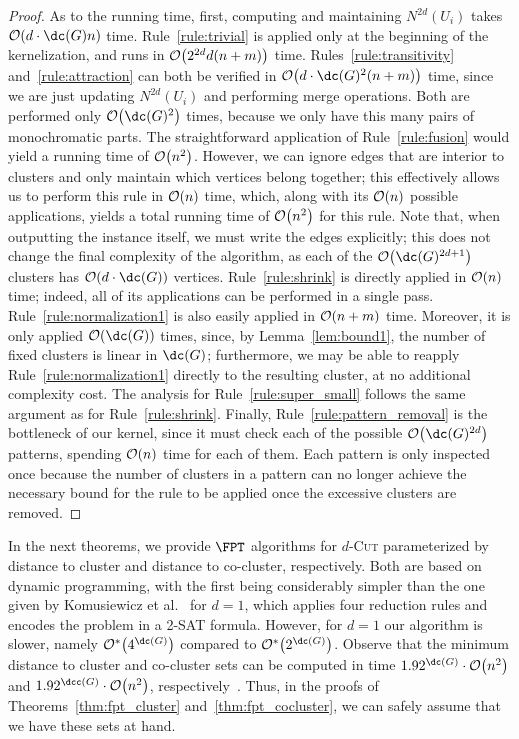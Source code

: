 \begin{proof}
    As to the running time, first, computing and maintaining $N^{2d}(U_i)$ takes $\bigO{d\cdot\dc(G)n}$ time.
    Rule~\ref{rule:trivial} is applied only at the beginning of the kernelization, and runs in $\mathcal{O}\!\left(2^{2d}d(n + m)\right)$ time.
    Rules~\ref{rule:transitivity} and~\ref{rule:attraction} can both be verified in $\bigO{d\cdot\dc(G)^2(n + m)}$ time, since we are just updating $N^{2d}(U_i)$ and performing merge operations.
    Both are performed only $\bigO{\dc(G)^2}$ times, because we only have this many pairs of monochromatic parts.
    The straightforward application of Rule~\ref{rule:fusion} would yield a running time of $\mathcal{O}\!\left(n^2\right)$. However, we can ignore edges that are interior to clusters and only maintain which vertices belong together; this effectively allows us to perform this rule in $\mathcal{O}\!\left(n\right)$ time, which, along with its $\mathcal{O}\!\left(n\right)$ possible applications, yields a total running time of $\mathcal{O}\!\left(n^2\right)$ for this rule.
    Note that, when outputting the instance itself, we must write the edges explicitly; this does not change the final complexity of the algorithm, as each of the $\bigO{\dc(G)^{2d+1}}$ clusters has $\bigO{d\cdot\dc(G)}$ vertices.
    Rule~\ref{rule:shrink} is directly applied in $\mathcal{O}\!\left(n\right)$ time; indeed, all of its applications can be performed in a single pass.
    Rule~\ref{rule:normalization1} is also easily applied in $\mathcal{O}\!\left(n + m\right)$ time. Moreover, it is only applied $\bigO{\dc(G)}$ times, since, by Lemma~\ref{lem:bound1}, the number of fixed clusters is linear in $\dc(G)$; furthermore, we may be able to reapply Rule~\ref{rule:normalization1} directly to the resulting cluster, at no additional complexity cost.
    The analysis for Rule~\ref{rule:super_small} follows the same argument as for Rule~\ref{rule:shrink}.
    Finally, Rule~\ref{rule:pattern_removal} is the bottleneck of our kernel, since it must check each of the possible $\bigO{\dc(G)^{2d}}$ patterns, spending $\mathcal{O}\!\left(n\right)$ time for each of them.
    Each pattern is only inspected once because the number of clusters in a pattern can no longer achieve the necessary bound for the rule to be applied once the excessive clusters are removed.
\end{proof}

In the next theorems, we provide $\FPT$ algorithms for \textsc{$d$-Cut} parameterized by distance to cluster and distance to co-cluster, respectively. Both are based on dynamic programming, with the first being considerably simpler than the one given by Komusiewicz  et al.~\cite{matching_cut_ipec} for $d=1$, which applies four reduction rules and encodes the problem in a 2-\textsc{SAT} formula.
However, for $d=1$ our algorithm is slower, namely $\bigOs{4^{\dc( G )}}$ compared to  $\bigOs{2^{\dc( G )}}$.
Observe that the minimum distance to cluster and co-cluster sets can be computed in time $1.92^{\dc( G )} \cdot \bigO{ n^2 }$
and $1.92^{\dcc( G )} \cdot \bigO{n^2 }$, respectively~\cite{branching-cluster}. Thus, in the proofs of Theorems~\ref{thm:fpt_cluster} and~\ref{thm:fpt_cocluster}, we can safely assume that we have these sets at hand.


